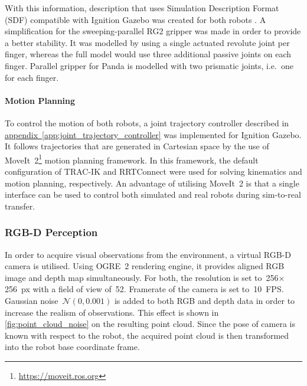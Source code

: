 With this information, description that uses Simulation Description Format (SDF) compatible with Ignition Gazebo was created for both robots \cite{orsula_manipulators_2021}. A simplification for the sweeping-parallel RG2 gripper was made in order to provide a better stability. It was modelled by using a single actuated revolute joint per finger, whereas the full model would use three additional passive joints on each finger. Parallel gripper for Panda is modelled with two prismatic joints, i.e.~one for each finger.

\newpage

\paragraph{Motion Planning} To control the motion of both robots, a joint trajectory controller described in \hyperref[app:joint_trajectory_controller]{appendix~\ref*{app:joint_trajectory_controller}} was implemented for Ignition Gazebo. It follows trajectories that are generated in Cartesian space by the use of MoveIt~2\footnote{\href{https://moveit.ros.org}{https://moveit.ros.org}} motion planning framework. In this framework, the default configuration of TRAC-IK \cite{beeson_trac-ik_2015} and RRTConnect \cite{kuffner_rrt-connect_2000} were used for solving kinematics and motion planning, respectively. An advantage of utilising MoveIt~2 is that a single interface can be used to control both simulated and real robots during sim-to-real transfer.


\subsubsection{RGB-D Perception}

In order to acquire visual observations from the environment, a virtual RGB-D camera is utilised. Using OGRE~2 rendering engine, it provides aligned RGB image and depth map simultaneously. For both, the resolution is set to~256\({\times}\)256~px with a field of view of~52\textdegree. Framerate of the camera is set to~10~FPS. Gaussian noise~\(\mathcal{N}(0, 0.001)\) is added to both RGB and depth data in order to increase the realism of observations. This effect is shown in \autoref{fig:point_cloud_noise} on the resulting point cloud. Since the pose of camera is known with respect to the robot, the acquired point cloud is then transformed into the robot base coordinate frame.

